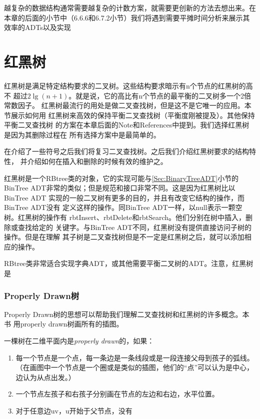越复杂的数据结构通常需要越复杂的计数方案，就需要更创新的方法去想出来。在本章的后面的小节中（6.6.6和6.7.2小节）我们将遇到需要平摊时间分析来展示其效率的ADTs以及实现

\section{红黑树}
红黑树是满足特定结构要求的二叉树。这些结构要求暗示有n个节点的红黑树的高不
超过$2\lg(n+1)$。就是说，它的高比有n个节点的最平衡的二叉树多一个2倍常数因子。
红黑树最流行的用处是做二叉查找树，但是这不是它唯一的应用。本节展示如何用
红黑树来高效的保持平衡二叉查找树（平衡度刚被提及）。其他保持平衡二叉查找树
的方案在本章后面的Note和References中提到。我们选择红黑树是因为其删除过程在
所有选择方案中是最简单的。

在介绍了一些符号之后我们将复习二叉查找树。之后我们介绍红黑树要求的结构特性，
并介绍如何在插入和删除的时候有效的维护之。

红黑树是一个RBtree类的对象，它的实现可能与\ref{Sec:BinaryTreeADT}小节的
BinTree ADT非常的类似；但是规范和接口非常不同。这是因为红黑树比以BinTree ADT
实现的一般二叉树有更多的目的，并且有改变它结构的操作，而BinTree ADT没有
定义这样的操作。同BinTree ADT一样，以null表示一颗空树。红黑树的操作有
rbtInsert、rbtDelete和rbtSearch。他们分别在树中插入，删除或查找给定的
关键字。与BinTree ADT不同，红黑树没有提供直接访问子树的操作。但是在理解
其子树是二叉查找树但是不一定是红黑树之后，就可以添加相应的操作。

RBtree类非常适合实现字典ADT，或其他需要平衡二叉树的ADT。注意，红黑树是

\subsubsection{Properly Drawn树}
Properly Drawn树的思想可以帮助我们理解二叉查找树和红黑树的许多概念。本书
用properly drawn树画所有的插图。

\begin{definition}\vspace{1ex}
一棵树在二维平面内是\emph{properly drawn}的，如果：
\begin{enumerate}
\item 每一个节点是一个点，每一条边是一条线段或是一段连接父母到孩子的弧线。
     （在画图中一个节点是一个圈或是类似的插图，他们的“点”可以认为是中心，
      边认为从点出发。）
\item 一个节点左孩子和右孩子分别画在节点的左边和右边，水平位置。
\item 对于任意边uv，u开始于父节点，没有
\end{enumerate}
\end{definition}

